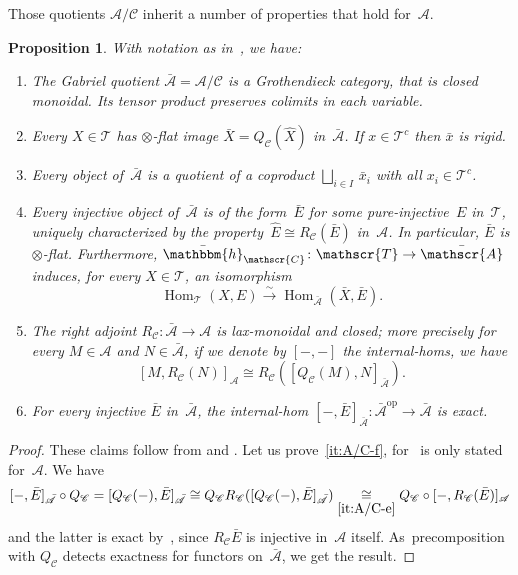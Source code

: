 \documentclass[10pt,a4paper]{amsart}
\newenvironment{enumeratea}
{\bgroup\def\theenumi{\alph{enumi}}\begin{enumerate}}
{\end{enumerate}\egroup}
\numberwithin{equation}{section}
\newtheorem{Prop}[equation]{Proposition}
\theoremstyle{definition}
\DeclareMathOperator{\Hom}{Hom}
\DeclareMathOperator{\opname}{op}
\newcommand{\cat}[1]{\mathscr{#1}}
\newcommand{\Homcat}[1]{\Hom_{\cat #1}}
\newcommand{\isoto}{\overset{\sim}{\longrightarrow}}
\newcommand{\op}{^{\opname}}
\newcommand{\bat}[1]{\bar{\cat{#1}}}
\newcommand{\boneda}{\bar\yoneda}
\newcommand{\cA}{\cat{A}}
\newcommand{\cC}{\cat{C}}
\newcommand{\cT}{\cat{T}}
\newcommand{\yoneda}{\mathbbm{h}}
\begin{document}
Those quotients $\cA/\cC$ inherit a number of properties that hold for~$\cA$.
\begin{Prop}
\label{Prop:A/C}
With notation as in~, we have:
\begin{enumeratea}
\item
\label{it:A/C-a}
The Gabriel quotient $\bat{A}=\cA/\cC$ is a Grothendieck category, that is closed monoidal. Its tensor product preserves colimits in each variable.
\item
\label{it:A/C-b}
Every $X\in\cT$ has $\otimes$-flat image $\bar X=Q_\cC(\hat X)$ in~$\bat{A}$. If $x\in \cT^c$ then $\bar x$ is rigid.
\item
\label{it:A/C-c}
Every object of~$\bat{A}$ is a quotient of a coproduct $\bigsqcup_{i\in I}\,\bar x_i$ with all $x_i\in \cT^c$.

\item
\label{it:A/C-d}
Every injective object of~$\bat{A}$ is of the form~$\bar E$ for some pure-injective~$E$ in~$\cT$, uniquely characterized by the property~$\hat E\cong R_\cC(\bar E)$ in~$\cA$. In particular, $\bar E$ is $\otimes$-flat. Furthermore, $\boneda_\cC\colon \cT\to \bat{A}$ induces, for every $X\in\cT$, an isomorphism
\[
\Homcat{T}(X,E)\isoto \Homcat{{\bat{A}}}(\bar X,\bar E).
\]
\item
\label{it:A/C-e}
The right adjoint $R_\cC\colon \bat{A}\to \cat{A}$ is lax-monoidal and closed; more precisely for every $M\in\cA$ and $N\in\bat{A}$, if we denote by $[-,-]$ the internal-homs, we have
\[
[M,R_\cC(N)]_{\cA}\cong R_{\cC}([Q_\cC(M),N]_{\bat{A}}).
\]
\item
\label{it:A/C-f}
For every injective $\bar E$ in~$\bat{A}$, the internal-hom $[-,\bar E]_{\bat{A}}\colon \bat{A}\op\to \bat{A}$ is exact.
\end{enumeratea}
\end{Prop}

\begin{proof}
These claims follow from \cite[App.\,A]{BalmerKrauseStevenson20} and \cite[\S2\,\&\,App.\,A]{BalmerKrauseStevenson19}. Let us prove~\eqref{it:A/C-f}, for~\cite[Lem.\,2.8]{BalmerKrauseStevenson19} is only stated for~$\cA$. We have
\[
[-,\bar E]_{\bat{A}}\circ Q_{\cC}=[Q_{\cC}(-),\bar E]_{\bat{A}}\cong Q_{\cC}R_{\cC}([Q_\cC(-),\bar E]_{\bat{A}})\underset{\eqref{it:A/C-e}}{\cong} Q_{\cC}\circ[-,R_\cC(\bar E)]_{\cat{A}}
\]
and the latter is exact by~\cite[Lem.\,2.8]{BalmerKrauseStevenson19}, since $R_\cC\bar E$ is injective in~$\cA$ itself. As~pre\-composition with $Q_\cC$ detects exactness for functors on~$\bat{A}$, we get the result.
\end{proof}
\end{document}
